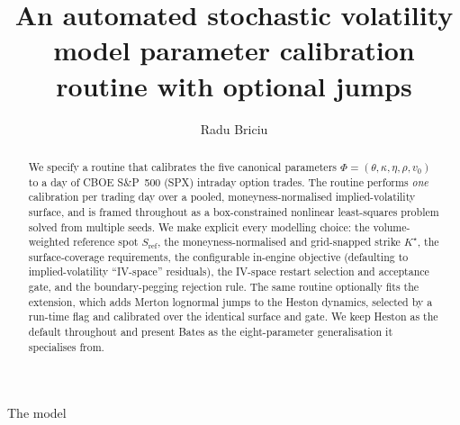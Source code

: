 \documentclass[a4paper, 11pt, reqno]{amsart}
\author[R. Briciu]{Radu Briciu}
\title[Stochastic volatility parameter calibration with optional jumps]{An automated stochastic volatility model parameter calibration routine with optional jumps}
\makeatletter
\def\section{\@startsection{section}{1}%
  \z@{.7\linespacing\@plus\linespacing}{.5\linespacing}%
  {\normalfont\bfseries\centering}}
\makeatother
\begin{document}
	\begin{titlepage}
		\vfill
		\begin{abstract}
			\noindent We specify a routine that calibrates the five canonical \citet{heston1993}
			parameters $\Phi=(\theta,\kappa,\eta,\rho,v_0)$ to a day of CBOE S\&P~500
			(SPX) intraday option trades. The routine performs \emph{one} calibration per
			trading day over a pooled, moneyness-normalised implied-volatility surface,
			and is framed throughout as a box-constrained nonlinear least-squares problem
			solved from multiple seeds. We make explicit every modelling choice: the
			volume-weighted reference spot $S_{\mathrm{ref}}$, the moneyness-normalised and
			grid-snapped strike $K^\star$, the surface-coverage requirements, the configurable
			in-engine objective (defaulting to implied-volatility ``IV-space'' residuals), the
			IV-space restart selection and acceptance gate, and the boundary-pegging rejection rule.
			The same routine optionally fits the \citet{bates1996} extension, which adds Merton lognormal
			jumps to the Heston dynamics, selected by a run-time flag and calibrated over the identical
			surface and gate. We keep Heston as the default throughout and present Bates as the
			eight-parameter generalisation it specialises from.
		\end{abstract}
		\vfill
		\maketitle
		\vfill
		{\small \tableofcontents}
		\vfill
	\end{titlepage}
	
	
	\section{The model}\label{sec:model}
\end{document}
